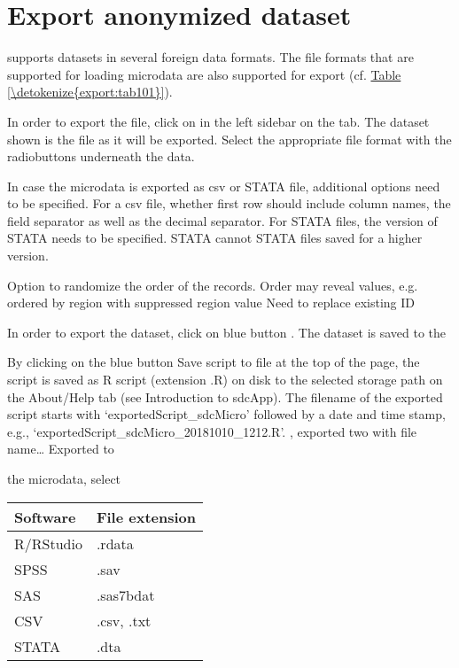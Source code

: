 \documentclass[letterpaper,10pt,english]{sphinxmanual}
\begin{document}
\section{Export anonymized dataset}
\label{\detokenize{export:export-anonymized-dataset}}
 supports datasets in several foreign data formats. The file formats that are
supported for loading microdata are also supported for export (cf. \hyperref[\detokenize{export:tab101}]{Table \ref{\detokenize{export:tab101}}}).

In order to export the file, click on   in the left sidebar on the
 tab. The dataset shown is the file as it will be exported. Select the
appropriate file format with the radiobuttons underneath the data.

In case the microdata is exported as csv or STATA file, additional options need to
be specified. For a csv file, whether first row should include column names,
the field separator as well as the decimal separator. For STATA files, the version of STATA
needs to be specified. STATA cannot STATA files saved for a higher version.

Option to randomize the order of the records. Order may reveal values, e.g.
ordered by region with suppressed region value Need to replace existing ID

In order to export the dataset, click on blue button . The dataset is saved
to the

By clicking on the blue button Save script to file at the top of the page, the script is
saved as R script (extension .R) on disk to the selected storage path on the
About/Help tab (see Introduction to sdcApp). The filename of the exported script
starts with ‘exportedScript\_sdcMicro’ followed by a date and time stamp, e.g.,
‘exportedScript\_sdcMicro\_20181010\_1212.R’.
, exported two with file name… Exported to

the microdata, select


\begin{savenotes}\sphinxattablestart
\centering
{}
\label{\detokenize{export:tab101}}\label{\detokenize{export:id1}}
\sphinxaftercaption
\begin{tabulary}{\linewidth}[t]{|T|T|}
\hline
\sphinxstyletheadfamily 
Software
&\sphinxstyletheadfamily 
File extension
\\
\hline
R/RStudio
&
.rdata
\\
\hline
SPSS
&
.sav
\\
\hline
SAS
&
.sas7bdat
\\
\hline
CSV
&
.csv, .txt
\\
\hline
STATA
&
.dta
\\
\hline
\end{tabulary}
\par
\sphinxattableend\end{savenotes}
\end{document}
